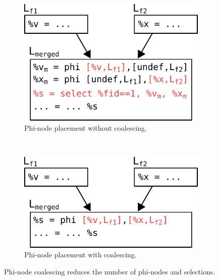
\begin{figure}[t]
  \centering
  \begin{subfigure}{.5\textwidth}
    \center
    \includegraphics[scale=0.65]{src/merge-operation/figs/phi-coalescing-select-1}
    \caption{Phi-node placement without coalescing.}
    \label{fig:phi-coalescing-select-1}
  \end{subfigure}
  \\
  \begin{subfigure}{.5\textwidth}
    \center
    \includegraphics[scale=0.65]{src/merge-operation/figs/phi-coalescing-select-2}
    \caption{Phi-node placement with coalescing.}
    \label{fig:phi-coalescing-select-2}
  \end{subfigure}
  \caption{Phi-node coalescing reduces the number of phi-nodes and selections.}
  \label{fig:phi-coalescing-select}
\end{figure}

